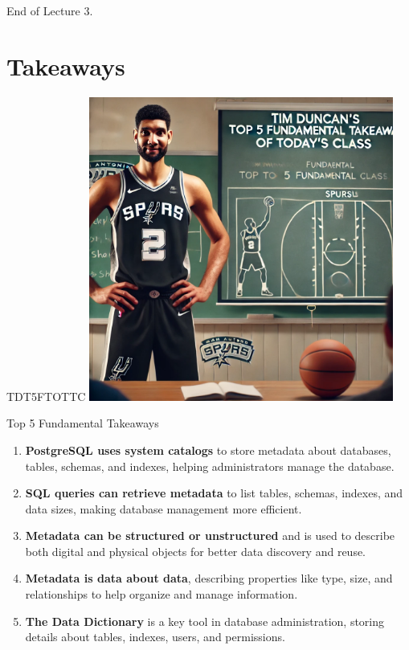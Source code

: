 \documentclass{beamer}
\begin{document}
\begin{frame}{}
    \centering
    \Huge End of Lecture 3.
\end{frame}

\section*{Takeaways}

\begin{frame}{TDT5FTOTTC}
    \centering
    \includegraphics[width=0.75\textwidth]{figures/tim.png}
\end{frame}

\begin{frame}{Top 5 Fundamental Takeaways}
    \begin{enumerate} \pause
        \item[5] \textbf{PostgreSQL uses system catalogs} to store metadata about databases, tables, schemas, and indexes, helping administrators manage the database.\pause
        \item[4] \textbf{SQL queries can retrieve metadata} to list tables, schemas, indexes, and data sizes, making database management more efficient.\pause
        \item[3] \textbf{Metadata can be structured or unstructured} and is used to describe both digital and physical objects for better data discovery and reuse.\pause
        \item[2] \textbf{Metadata is data about data}, describing properties like type, size, and relationships to help organize and manage information.\pause
        \item[1] \textbf{The Data Dictionary} is a key tool in database administration, storing details about tables, indexes, users, and permissions.\pause
        \end{enumerate}
\end{frame}
\end{document}
